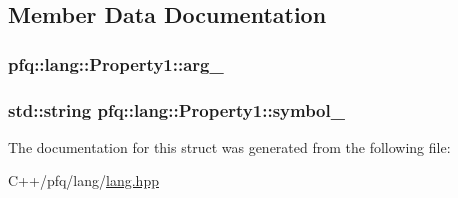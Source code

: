 \subsection{Member Data Documentation}
\hypertarget{structpfq_1_1lang_1_1Property1_a11dd41a5898508a7d4d4210be8e1a8f5}{
\subsubsection[{arg\+\_\+}]{ pfq\+::lang\+::\+Property1\+::arg\+\_\+}}\label{structpfq_1_1lang_1_1Property1_a11dd41a5898508a7d4d4210be8e1a8f5}
\hypertarget{structpfq_1_1lang_1_1Property1_a23d6015f019970c8790ecb19e46125a7}{
\subsubsection[{symbol\+\_\+}]{\setlength{\rightskip}{0pt plus 5cm}std\+::string pfq\+::lang\+::\+Property1\+::symbol\+\_\+}}\label{structpfq_1_1lang_1_1Property1_a23d6015f019970c8790ecb19e46125a7}


The documentation for this struct was generated from the following file\+:\begin{DoxyCompactItemize}
\item 
C++/pfq/lang/\hyperlink{lang_8hpp}{lang.\+hpp}\end{DoxyCompactItemize}
